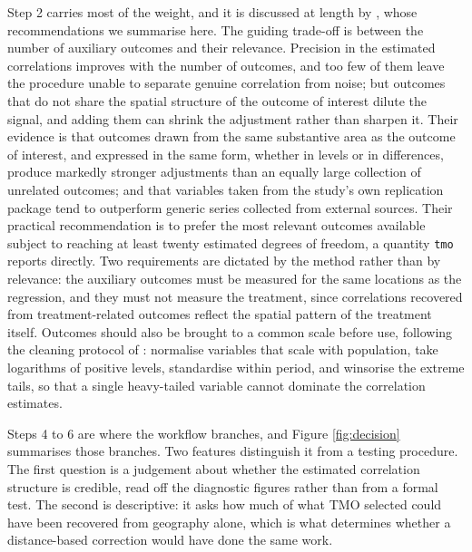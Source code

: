 \documentclass[varwidth,bib]{statapress}
\begin{document}
Step 2 carries most of the weight, and it is discussed at length by \citet{Dellavignaetal2025}, whose recommendations we summarise here.  The guiding trade-off is between the number of auxiliary outcomes and their relevance.  Precision in the estimated correlations improves with the number of outcomes, and too few of them leave the procedure unable to separate genuine correlation from noise; but outcomes that do not share the spatial structure of the outcome of interest dilute the signal, and adding them can shrink the adjustment rather than sharpen it.  Their evidence is that outcomes drawn from the same substantive area as the outcome of interest, and expressed in the same form, whether in levels or in differences, produce markedly stronger adjustments than an equally large collection of unrelated outcomes; and that variables taken from the study's own replication package tend to outperform generic series collected from external sources.  Their practical recommendation is to prefer the most relevant outcomes available subject to reaching at least twenty estimated degrees of freedom, a quantity {\tt tmo} reports directly.  Two requirements are dictated by the method rather than by relevance: the auxiliary outcomes must be measured for the same locations as the regression, and they must not measure the treatment, since correlations recovered from treatment-related outcomes reflect the spatial pattern of the treatment itself.  Outcomes should also be brought to a common scale before use, following the cleaning protocol of \citet[Appendix B.1]{Dellavignaetal2025}: normalise variables that scale with population, take logarithms of positive levels, standardise within period, and winsorise the extreme tails, so that a single heavy-tailed variable cannot dominate the correlation estimates.

Steps 4 to 6 are where the workflow branches, and Figure \ref{fig:decision} summarises those branches.  Two features distinguish it from a testing procedure.  The first question is a judgement about whether the estimated correlation structure is credible, read off the diagnostic figures rather than from a formal test.  The second is descriptive: it asks how much of what TMO selected could have been recovered from geography alone, which is what determines whether a distance-based correction would have done the same work.
\end{document}
